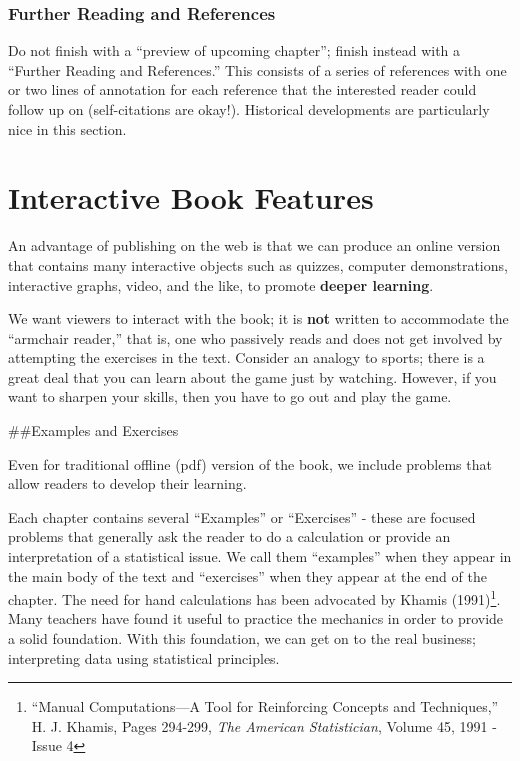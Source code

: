 \documentclass[
]{book}
\begin{document}
\hypertarget{further-reading-and-references}{%
\subsection{Further Reading and References}\label{further-reading-and-references}}

Do not finish with a ``preview of upcoming chapter''; finish instead with a ``Further Reading and References.'' This consists of a series of references with one or two lines of annotation for each reference that the interested reader could follow up on (self-citations are okay!). Historical developments are particularly nice in this section.

\hypertarget{S:Interactive}{%
\chapter{Interactive Book Features}\label{S:Interactive}}

An advantage of publishing on the web is that we can produce an online version that contains many interactive objects such as quizzes, computer demonstrations, interactive graphs, video, and the like, to promote \textbf{deeper learning}.

We want viewers to interact with the book; it is \textbf{not} written to accommodate the ``armchair reader,'' that is, one who passively reads and does not get involved by attempting the exercises in the text. Consider an analogy to sports; there is a great deal that you can learn about the game just by watching. However, if you want to sharpen your skills, then you have to go out and play the game.

\#\#Examples and Exercises

Even for traditional offline (pdf) version of the book, we include problems that allow readers to develop their learning.

Each chapter contains several ``Examples'' or ``Exercises'' - these are focused problems that generally ask the reader to do a calculation or provide an interpretation of a statistical issue. We call them ``examples'' when they appear in the main body of the text and ``exercises'' when they appear at the end of the chapter. The need for hand calculations has been advocated by Khamis (1991)\footnote{``Manual Computations---A Tool for Reinforcing Concepts and Techniques,'' H. J. Khamis, Pages 294-299, \emph{The American Statistician}, Volume 45, 1991 - Issue 4}. Many teachers have found it useful to practice the mechanics in order to provide a solid foundation. With this foundation, we can get on to the real business; interpreting data using statistical principles.
\end{document}
